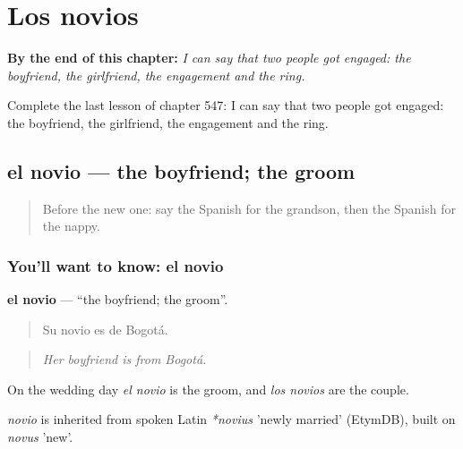 
\chapter{Los novios}
\label{ch:es-los-novios}

\begin{chapteropening}
\textbf{By the end of this chapter:} \emph{I can say that two people got engaged: the boyfriend, the girlfriend, the engagement and the ring.}

Complete the last lesson of chapter 547: I can say that two people got engaged: the boyfriend, the girlfriend, the engagement and the ring.
\end{chapteropening}

\section[el novio]{el novio — the boyfriend; the groom}

\label{lesson:ES-C547-novio}



\begin{quote}
Before the new one: say the Spanish for the grandson, then the Spanish for the nappy.
\end{quote}

\subsection*{You'll want to know: el novio}
\textbf{el novio} — \textquotedblleft{}the boyfriend; the groom\textquotedblright{}.

\begin{quote}
Su novio es de Bogotá.
\end{quote}

\begin{quote}
\emph{Her boyfriend is from Bogotá.}
\end{quote}

On the wedding day \emph{el novio} is the groom, and \emph{los novios} are the couple.

\begin{cousinweb}
\emph{novio} is inherited from spoken Latin \emph{*novius} 'newly married' (EtymDB), built on \emph{novus} 'new'.
\end{cousinweb}

